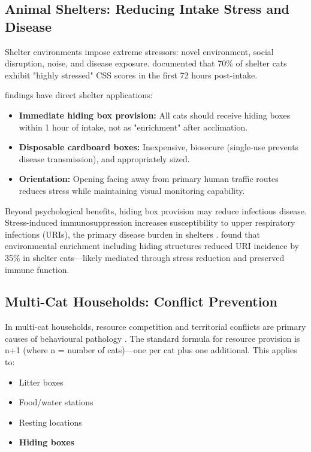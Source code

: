 \documentclass[12pt,a4paper]{article}
\begin{document}
\subsection{Animal Shelters: Reducing Intake Stress and Disease}

Shelter environments impose extreme stressors: novel environment, social disruption, noise, and disease exposure. \citet{kessler1997} documented that 70\% of shelter cats exhibit "highly stressed" CSS scores in the first 72 hours post-intake.

\citet{vinke2014} findings have direct shelter applications:

\begin{itemize}
    \item \textbf{Immediate hiding box provision:} All cats should receive hiding boxes within 1 hour of intake, not as "enrichment" after acclimation.
    
    \item \textbf{Disposable cardboard boxes:} Inexpensive, biosecure (single-use prevents disease transmission), and appropriately sized.
    
    \item \textbf{Orientation:} Opening facing away from primary human traffic routes reduces stress while maintaining visual monitoring capability.
\end{itemize}

Beyond psychological benefits, hiding box provision may reduce infectious disease. Stress-induced immunosuppression increases susceptibility to upper respiratory infections (URIs), the primary disease burden in shelters \citep{tanaka2012}. \citet{stella2011} found that environmental enrichment including hiding structures reduced URI incidence by 35\% in shelter cats—likely mediated through stress reduction and preserved immune function.

\subsection{Multi-Cat Households: Conflict Prevention}

In multi-cat households, resource competition and territorial conflicts are primary causes of behavioural pathology \citep{crowell-davis2004}. The standard formula for resource provision is n+1 (where n = number of cats)—one per cat plus one additional. This applies to:

\begin{itemize}
    \item Litter boxes
    \item Food/water stations
    \item Resting locations
    \item \textbf{Hiding boxes}
\end{itemize}
\end{document}
